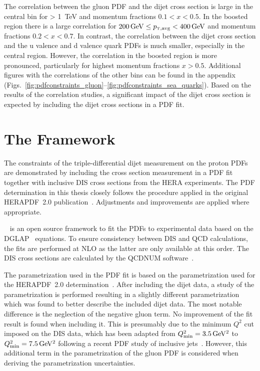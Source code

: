 The correlation between the gluon PDF and the dijet cross section is large in
the central bin for \ptavg > \SI{1}{\TeV} and momentum fractions $0.1 < x <
0.5$. In the boosted region there is a large correlation for $\SI{200}{\GeV}
\leq \ptavg < \SI{400}{\GeV}$ and momentum fractions $0.2 < x < 0.7$. In
contrast, the correlation between the dijet cross section and the u valence and
d valence quark PDFs is much smaller, especially in the central region. However,
the correlation in the boosted region is more pronounced, particularly for
highest momentum fractions $x > 0.5$. Additional figures with the correlations
of the other bins can be found in the appendix
(Figs.~\ref{fig:pdfconstraints_gluon}--\ref{fig:pdfconstraints_sea_quarks}). Based
on the results of the correlation studies, a significant impact of the dijet
cross section is expected by including the dijet cross sections in a PDF fit.

\section{The \xfitter Framework}
\label{section:herafittersetup}

The constraints of the triple-differential dijet measurement on the proton PDFs
are demonstrated by including the cross section measurement in a PDF fit
together with inclusive DIS cross sections from the HERA experiments. The PDF
determination in this thesis closely follows the procedure applied in the
original HERAPDF~2.0 publication~\cite{Abramowicz:2015mha}. Adjustments and improvements are applied where
appropriate.

\xfitter~\cite{Alekhin:2014irh} is an open source framework to fit the PDFs to experimental data based
on the DGLAP~\cite{Gribov:1972ri,Altarelli:1977zs,Dokshitzer:1977sg} equations.
To ensure consistency between DIS and QCD calculations, the fits are performed
at NLO as the latter are only available at this order. The DIS cross sections
are calculated by the QCDNUM software~\cite{Botje:2010ay}.

The parametrization used in the PDF fit is based on the parametrization used for
the HERAPDF~2.0 determination~\cite{Abramowicz:2015mha}. After including the
dijet data, a study of the parametrization is performed resulting in a slightly
different parametrization which was found to better describe the included dijet
data. The most notable difference is the neglection of the negative gluon term.
No improvement of the fit result is found when including it. This is presumably
due to the minimum $Q^2$ cut imposed on the DIS data, which has been adapted from
$Q^2_\mathrm{min}=\SI{3.5}{\GeVsq}$ to $Q^2_\mathrm{min}=\SI{7.5}{\GeVsq}$
following a recent PDF study of inclusive jets~\cite{Khachatryan:2014waa}.
However, this additional term in the parametrization of the gluon PDF is
considered when deriving the parametrization uncertainties.

